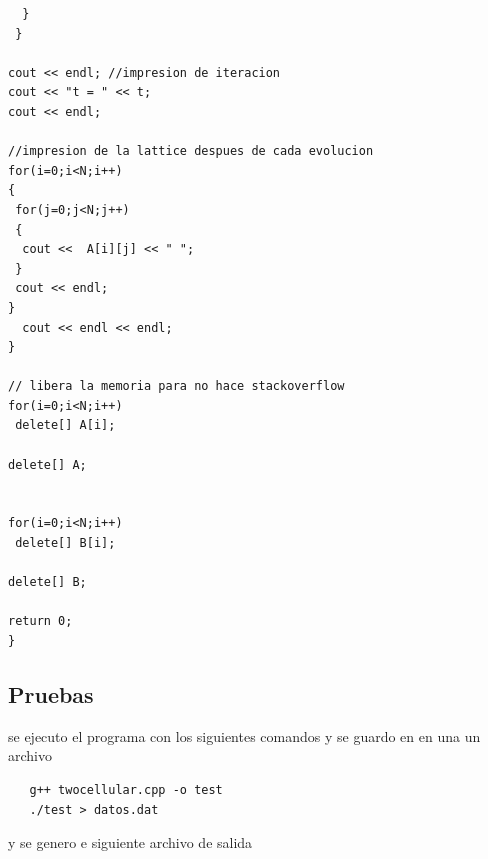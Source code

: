 \documentclass[a4paper,12pt]{article}
\begin{document}
\begin{verbatim}
  }
 }

cout << endl; //impresion de iteracion
cout << "t = " << t; 
cout << endl;

//impresion de la lattice despues de cada evolucion
for(i=0;i<N;i++)
{
 for(j=0;j<N;j++)
 {
  cout <<  A[i][j] << " "; 
 }
 cout << endl;
}
  cout << endl << endl;
} 

// libera la memoria para no hace stackoverflow
for(i=0;i<N;i++) 
 delete[] A[i];

delete[] A;


for(i=0;i<N;i++) 
 delete[] B[i]; 

delete[] B;

return 0;
}
  \end{verbatim}

 

 \subsection{Pruebas}

   se ejecuto el programa con los siguientes comandos y se guardo en en una un archivo

  \begin{verbatim}
   g++ twocellular.cpp -o test
   ./test > datos.dat 

  \end{verbatim}

  y se genero e siguiente archivo de salida
\end{document}
